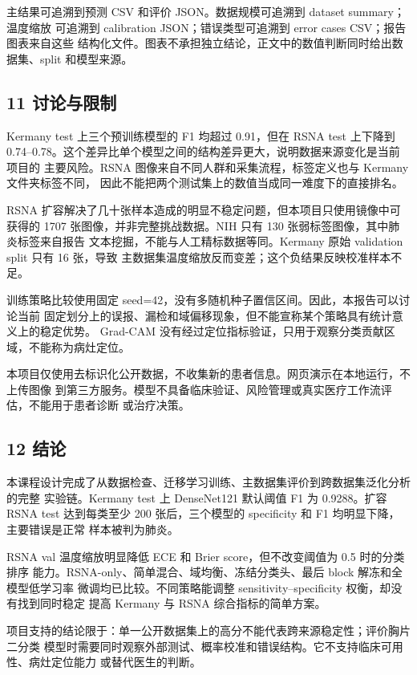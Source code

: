 \documentclass[
]{ctexart}
\begin{document}
主结果可追溯到预测 CSV 和评价 JSON。数据规模可追溯到 dataset summary；温度缩放
可追溯到 calibration JSON；错误类型可追溯到 error cases CSV；报告图表来自这些
结构化文件。图表不承担独立结论，正文中的数值判断同时给出数据集、split 和模型来源。

\clearpage
\subsection{11 讨论与限制}

Kermany test 上三个预训练模型的 F1 均超过 0.91，但在 RSNA test 上下降到
0.74--0.78。这个差异比单个模型之间的结构差异更大，说明数据来源变化是当前项目的
主要风险。RSNA 图像来自不同人群和采集流程，标签定义也与 Kermany 文件夹标签不同，
因此不能把两个测试集上的数值当成同一难度下的直接排名。

RSNA 扩容解决了几十张样本造成的明显不稳定问题，但本项目只使用镜像中可获得的
1707 张图像，并非完整挑战数据。NIH 只有 130 张弱标签图像，其中肺炎标签来自报告
文本挖掘，不能与人工精标数据等同。Kermany 原始 validation split 只有 16 张，导致
主数据集温度缩放反而变差；这个负结果反映校准样本不足。

训练策略比较使用固定 seed=42，没有多随机种子置信区间。因此，本报告可以讨论当前
固定划分上的误报、漏检和域偏移现象，但不能宣称某个策略具有统计意义上的稳定优势。
Grad-CAM 没有经过定位指标验证，只用于观察分类贡献区域，不能称为病灶定位。

本项目仅使用去标识化公开数据，不收集新的患者信息。网页演示在本地运行，不上传图像
到第三方服务。模型不具备临床验证、风险管理或真实医疗工作流评估，不能用于患者诊断
或治疗决策。

\clearpage
\subsection{12 结论}

本课程设计完成了从数据检查、迁移学习训练、主数据集评价到跨数据集泛化分析的完整
实验链。Kermany test 上 DenseNet121 默认阈值 F1 为 0.9288。扩容 RSNA test
达到每类至少 200 张后，三个模型的 specificity 和 F1 均明显下降，主要错误是正常
样本被判为肺炎。

RSNA val 温度缩放明显降低 ECE 和 Brier score，但不改变阈值为 0.5 时的分类排序
能力。RSNA-only、简单混合、域均衡、冻结分类头、最后 block 解冻和全模型低学习率
微调均已比较。不同策略能调整 sensitivity--specificity 权衡，却没有找到同时稳定
提高 Kermany 与 RSNA 综合指标的简单方案。

项目支持的结论限于：单一公开数据集上的高分不能代表跨来源稳定性；评价胸片二分类
模型时需要同时观察外部测试、概率校准和错误结构。它不支持临床可用性、病灶定位能力
或替代医生的判断。
\end{document}
